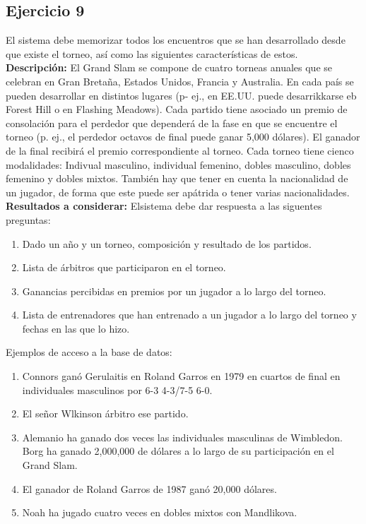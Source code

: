 \documentclass[a4paper, 12pt]{article}
\begin{document}
\begin{justify}
        \subsection{Ejercicio 9}
        \justify
        El sistema debe memorizar todos los encuentros que se han desarrollado desde que existe el torneo, así como las siguientes características de estos.\\
        \textbf{Descripción:} El Grand Slam se compone de cuatro torneas anuales que se celebran en Gran Bretaña, Estados Unidos, Francia y Australia. En cada país se pueden desarrollar en distintos lugares
        (p- ej., en EE.UU. puede desarrikkarse eb Forest Hill o en Flashing Meadows). Cada partido tiene asociado un premio de consolación para el perdedor que dependerá de la fase en que se encuentre el torneo (p. ej., el perdedor octavos de final puede ganar 5,000 dólares).
        El ganador de la final recibirá el premio correspondiente al torneo. Cada torneo tiene cienco modalidades: Indivual masculino, individual femenino, dobles masculino, dobles femenino y dobles mixtos. También hay que tener en cuenta la nacionalidad de un jugador, de forma que
        este puede ser apátrida o tener varias nacionalidades.\\
        \textbf{Resultados a considerar:} Elsistema debe dar respuesta a las siguentes preguntas:
        \begin{enumerate}
            \item Dado un año y un torneo, composición y resultado de los partidos.
            \item Lista de árbitros que participaron en el torneo.
            \item Ganancias percibidas en premios por un jugador a lo largo del torneo.
            \item Lista de entrenadores que han entrenado a un jugador a lo largo del torneo y fechas en las que lo hizo.
        \end{enumerate} 
        Ejemplos de acceso a la base de datos:
        \begin{enumerate}
            \item Connors ganó Gerulaitis en Roland Garros en 1979 en cuartos de final en individuales masculinos por 6-3 4-3/7-5 6-0.
            \item El señor Wlkinson árbitro ese partido.
            \item Alemanio ha ganado dos veces las individuales masculinas de Wimbledon. Borg ha ganado 2,000,000 de dólares a lo largo de su participación en el Grand Slam.
            \item El ganador de Roland Garros de 1987 ganó 20,000 dólares.
            \item Noah ha jugado cuatro veces en dobles mixtos con Mandlikova.
        \end{enumerate}

\end{justify}
\end{document}
